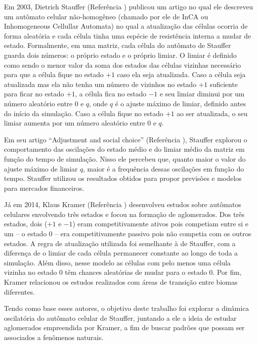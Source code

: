 \documentclass[11pt,a4paper,twocolumn,final]{article}
\begin{document}
Em 2003, Dietrich Stauffer (Referência \cite{stauffer}) publicou um artigo no qual ele descreveu um autômato celular não-homogêneo (chamado por ele de InCA ou Inhomogeneous Cellullar Automata) no qual a atualização das células ocorria de forma aleatória e cada célula tinha uma espécie de resistência interna a mudar de estado. Formalmente, em uma matriz, cada célula do autômato de Stauffer guarda dois números: o próprio estado e o próprio limiar. O limiar é definido como sendo o menor valor da soma dos estados das células vizinhas necessário para que a célula fique no estado $+1$ caso ela seja atualizada. Caso a célula seja atualizada mas ela não tenha um número de vizinhos no estado $+1$ suficiente para ficar no estado $+1$, a célula fica no estado $-1$ e seu limiar diminui por um número aleatório entre $0$ e $q$, onde $q$ é o ajuste máximo de limiar, definido antes do início da simulação. Caso a célula fique no estado $+1$ ao ser atualizada, o seu limiar aumenta por um número aleatório entre $0$ e $q$.

Em seu artigo ``Adjustment and social choice'' (Referência \cite{stauffer}), Stauffer explorou o comportamento das oscilações do estado médio e do limiar médio da matriz em função do tempo de simulação. Nisso ele percebeu que, quanto maior o valor do ajuste máximo de limiar $q$, maior é a frequência dessas oscilações em função do tempo. Stauffer utilizou os resultados obtidos para propor previsões e modelos para mercados financeiros.

Já em 2014, Klaus Kramer (Referência \cite{klaus}) desenvolveu estudos sobre autômatos celulares envolvendo três estados e focou na formação de aglomerados. Dos três estados, dois ($+1$ e $-1$) eram competitivamente ativos pois competiam entre si e um -- o estado $0$ -- era competitivamente passivo pois não competia com os outros estados. A regra de atualização utilizada foi semelhante à de Stauffer, com a diferença de o limiar de cada célula permanecer constante ao longo de toda a simulação. Além disso, nesse modelo as células com pelo menos uma célula vizinha no estado $0$ têm chances aleatórias de mudar para o estado $0$. Por fim, Kramer relacionou os estudos realizados com áreas de transição entre biomas diferentes.

Tendo como base esses autores, o objetivo deste trabalho foi explorar a dinâmica oscilatória do autômato celular de Stauffer, juntando a ele a ideia de estudar aglomerados empreendida por Kramer, a fim de buscar padrões que possam ser associados a fenômenos naturais.
\end{document}
